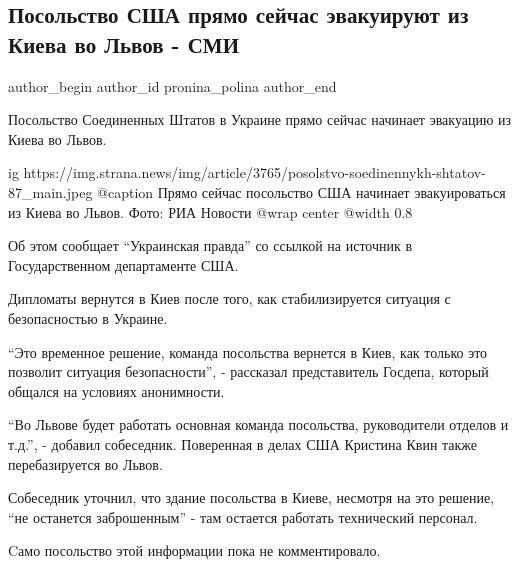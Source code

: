  
 
 
 
 
 
\subsection{Посольство США прямо сейчас эвакуируют из Киева во Львов - СМИ}
\label{sec:13_02_2022.stz.news.ua.strana.2.posolstvo_usa_evakuacia_lvov}
 
\ifcmt
 author_begin
   author_id pronina_polina
 author_end
\fi

Посольство Соединенных Штатов в Украине прямо сейчас начинает эвакуацию из
Киева во Львов.

\ifcmt
  ig https://img.strana.news/img/article/3765/posolstvo-soedinennykh-shtatov-87_main.jpeg
  @caption Прямо сейчас посольство США начинает эвакуироваться из Киева во Львов. Фото: РИА Новости 
  @wrap center
  @width 0.8
\fi

Об этом сообщает \enquote{Украинская правда} со ссылкой на источник в Государственном
департаменте США.

Дипломаты вернутся в Киев после того, как стабилизируется ситуация с
безопасностью в Украине.

\enquote{Это временное решение, команда посольства вернется в Киев, как только это
позволит ситуация безопасности}, - рассказал представитель Госдепа, который
общался на условиях анонимности. 

\enquote{Во Львове будет работать основная команда посольства, руководители отделов и
т.д.}, - добавил собеседник. Поверенная в делах США Кристина Квин также
перебазируется во Львов.

Собеседник уточнил, что здание посольства в Киеве, несмотря на это решение, \enquote{не
останется заброшенным} - там остается работать технический персонал. 

Cамо посольство этой информации пока не комментировало.

